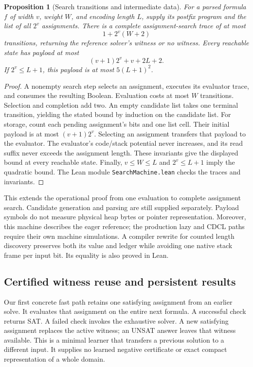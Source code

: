 \documentclass[11pt,a4paper]{article}
\numberwithin{equation}{section}
\theoremstyle{plain}
\newtheorem{proposition}[lemma]{Proposition}
\theoremstyle{definition}
\theoremstyle{remark}
\begin{document}
\begin{proposition}[Search transitions and intermediate data]
\label{prop:search-machine}
For a parsed formula $f$ of width $v$, weight $W$, and encoding length $L$, supply its postfix program and the list of all $2^v$ assignments. There is a complete assignment-search trace of at most
\[
  1+2^v(W+2)
\]
transitions, returning the reference solver's witness or no witness. Every reachable state has payload at most
\[
  (v+1)2^v+v+2L+2.
\]
If $2^v\leq L+1$, this payload is at most $5(L+1)^2$.
\end{proposition}

\begin{proof}
A nonempty search step selects an assignment, executes its evaluator trace, and consumes the resulting Boolean. Evaluation costs at most $W$ transitions. Selection and completion add two. An empty candidate list takes one terminal transition, yielding the stated bound by induction on the candidate list. For storage, count each pending assignment's bits and one list cell. Their initial payload is at most $(v+1)2^v$. Selecting an assignment transfers that payload to the evaluator. The evaluator's code/stack potential never increases, and its read suffix never exceeds the assignment length. These invariants give the displayed bound at every reachable state. Finally, $v\leq W\leq L$ and $2^v\leq L+1$ imply the quadratic bound. The Lean module \texttt{SearchMachine.lean} checks the traces and invariants.
\end{proof}

This extends the operational proof from one evaluation to complete assignment search. Candidate generation and parsing are still supplied separately. Payload symbols do not measure physical heap bytes or pointer representation. Moreover, this machine describes the eager reference; the production lazy and CDCL paths require their own machine simulations. A compiler rewrite for counted length discovery preserves both its value and ledger while avoiding one native stack frame per input bit. Its equality is also proved in Lean.

\subsection{Certified witness reuse and persistent results}
\label{sec:persistent-solver}

Our first concrete fast path retains one satisfying assignment from an earlier solve. It evaluates that assignment on the entire next formula. A successful check returns SAT. A failed check invokes the exhaustive solver. A new satisfying assignment replaces the active witness; an UNSAT answer leaves that witness available. This is a minimal learner that transfers a previous solution to a different input. It supplies no learned negative certificate or exact compact representation of a whole domain.
\end{document}
